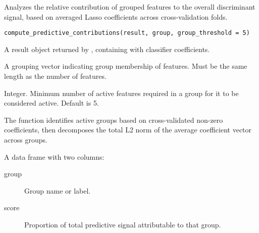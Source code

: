 \documentclass[a4paper]{book}
\begin{document}
%
\begin{Description}
Analyzes the relative contribution of grouped features to the overall discriminant signal, based on averaged Lasso coefficients across cross-validation folds.
\end{Description}
%
\begin{Usage}
\begin{verbatim}
compute_predictive_contributions(result, group, group_threshold = 5)
\end{verbatim}
\end{Usage}
%
\begin{Arguments}
\begin{ldescription}
\item[\code{result}] A result object returned by , containing  with classifier coefficients.

\item[\code{group}] A grouping vector indicating group membership of features. Must be the same length as the number of features.

\item[\code{group\_threshold}] Integer. Minimum number of active features required in a group for it to be considered active. Default is 5.
\end{ldescription}
\end{Arguments}
%
\begin{Details}
The function identifies active groups based on cross-validated non-zero coefficients, then decomposes the total L2 norm of the average coefficient vector across groups.
\end{Details}
%
\begin{Value}
A data frame with two columns:
\begin{description}

\item[group] Group name or label.
\item[score] Proportion of total predictive signal attributable to that group.

\end{description}

\end{Value}
%
\begin{SeeAlso}
\end{SeeAlso}
\end{document}
